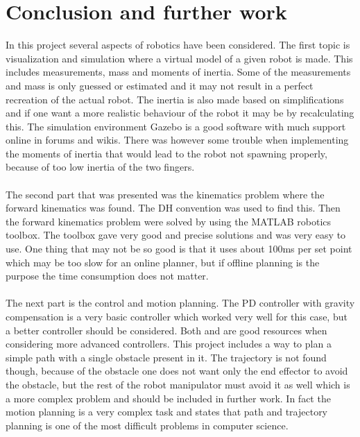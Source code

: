 \chapter{Conclusion and further work}
In this project several aspects of robotics have been considered. The first topic is visualization and simulation where a virtual model of a given robot is made. This includes measurements, mass and moments of inertia. Some of the measurements and mass is only guessed or estimated and it may not result in a perfect recreation of the actual robot. The inertia is also made based on simplifications and if one want a more realistic behaviour of the robot it may be by recalculating this. The simulation environment Gazebo is a good software with much support online in forums and wikis. There was however some trouble when implementing the moments of inertia that would lead to the robot not spawning properly, because of too low inertia of the two fingers.\\\\
The second part that was presented was the kinematics problem where the forward kinematics was found. The DH convention was used to find this. Then the forward kinematics problem were solved by using the MATLAB robotics toolbox\cite{MatlabRobTool}. The toolbox gave very good and precise solutions and was very easy to use. One thing that may not be so good is that it uses about 100ms per set point which may be too slow for an online planner, but if offline planning is the purpose the time consumption does not matter.
\\\\
The next part is the control and motion planning. The PD controller with gravity compensation is a very basic controller which worked very well for this case, but a better controller should be considered. Both \cite{spong} and \cite{Siciliano} are good resources when considering more advanced controllers. This project includes a way to plan a simple path with a single obstacle present in it. The trajectory is not found though, because of the obstacle one does not want only the end effector to avoid the obstacle, but the rest of the robot manipulator must avoid it as well which is a more complex problem and should be included in further work. In fact the motion planning is a very complex task and \cite{spong} states that path and trajectory planning is one of the most difficult problems in computer science.